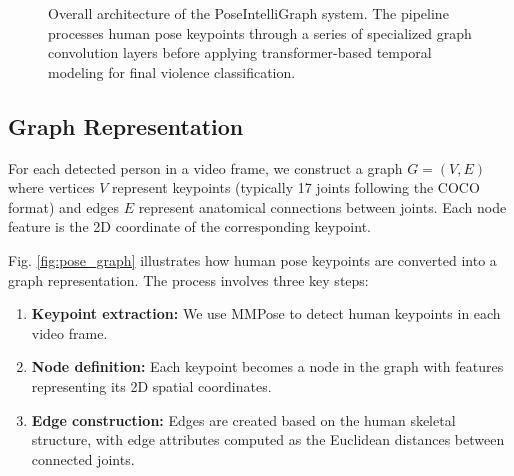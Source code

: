 \documentclass[conference]{IEEEtran}
\begin{document}
\begin{figure*}[htbp]
\begin{adjustbox}{max width=\textwidth}
    \end{adjustbox}
    \caption{Overall architecture of the PoseIntelliGraph system. The pipeline processes human pose keypoints through a series of specialized graph convolution layers before applying transformer-based temporal modeling for final violence classification.}
    \label{fig:architecture}
\end{figure*}

\subsection{Graph Representation}
For each detected person in a video frame, we construct a graph $G = (V, E)$
where vertices $V$ represent keypoints (typically 17 joints following the COCO
format) and edges $E$ represent anatomical connections between joints. Each
node feature is the 2D coordinate of the corresponding keypoint.

Fig. \ref{fig:pose_graph} illustrates how human pose keypoints are converted
into a graph representation. The process involves three key steps:

\begin{enumerate}
    \item \textbf{Keypoint extraction:} We use MMPose to detect human keypoints in each video frame.
    \item \textbf{Node definition:} Each keypoint becomes a node in the graph with features representing its 2D spatial coordinates.
    \item \textbf{Edge construction:} Edges are created based on the human skeletal structure, with edge attributes computed as the Euclidean distances between connected joints.
\end{enumerate}
\end{document}
